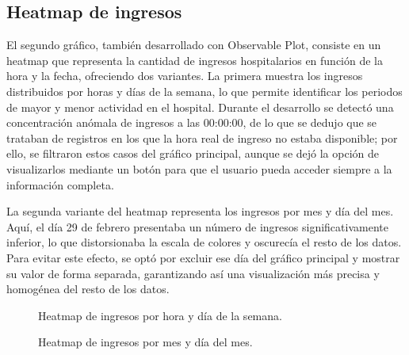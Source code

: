 \subsection{Heatmap de ingresos}
El segundo gráfico, también desarrollado con Observable Plot, consiste en un heatmap\cite{heatmap} que representa la cantidad de ingresos hospitalarios en función de la hora y la fecha, ofreciendo dos variantes. La primera muestra los ingresos distribuidos por horas y días de la semana, lo que permite identificar los periodos de mayor y menor actividad en el hospital. Durante el desarrollo se detectó una concentración anómala de ingresos a las 00:00:00, de lo que se dedujo que se trataban de registros en los que la hora real de ingreso no estaba disponible; por ello, se filtraron estos casos del gráfico principal, aunque se dejó la opción de visualizarlos mediante un botón para que el usuario pueda acceder siempre a la información completa.

La segunda variante del heatmap representa los ingresos por mes y día del mes. Aquí, el día 29 de febrero presentaba un número de ingresos significativamente inferior, lo que distorsionaba la escala de colores y oscurecía el resto de los datos. Para evitar este efecto, se optó por excluir ese día del gráfico principal y mostrar su valor de forma separada, garantizando así una visualización más precisa y homogénea del resto de los datos.
\begin{figure}[H]
  \centering
  \caption{Heatmap de ingresos por hora y día de la semana.}
  \label{fig:chart-heat-1}
\end{figure}
\begin{figure}[H]
  \centering
  \caption{Heatmap de ingresos por mes y día del mes.}
  \label{fig:chart-heat-2}
\end{figure}

